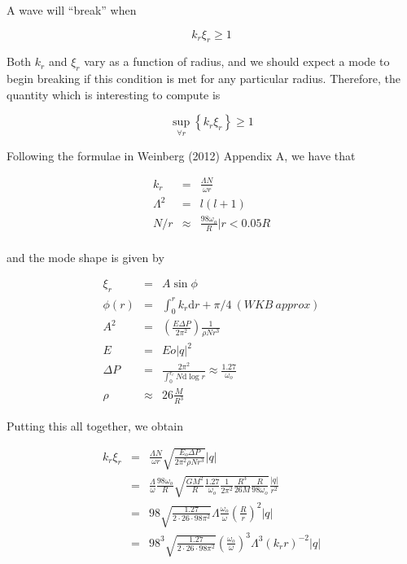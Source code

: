A wave will ``break'' when

\begin{equation}
k_r \xi_r \geq 1
\end{equation}

Both $k_r$ and $\xi_r$ vary as a function of radius, and we should expect a mode to begin breaking if this condition is met for any particular radius. Therefore, the quantity which is interesting to compute is

\begin{equation}
\sup_{\forall r} \left\{k_r \xi_r\right\} \geq 1
\end{equation}

Following the formulae in Weinberg (2012) Appendix A, we have that

\begin{eqnarray}
k_r & = & \frac{\Lambda N}{\omega r} \\
\Lambda^2 & = & l(l+1) \\
N/r & \approx & \frac{98 \omega_o}{R} \left| r < 0.05 R \right. \\
\end{eqnarray}

and the mode shape is given by

\begin{eqnarray}
\xi_r & = & A\sin\phi \\
\phi(r) & = & \int_0^r k_r \mathrm{d}r + \pi/4 \ (WKB\ approx) \\
A^2 & = & \left(\frac{E \Delta P}{2\pi^2}\right)\frac{1}{\rho N r^3} \\
E & = & Eo |q|^2 \\
\Delta P & = & \frac{2\pi^2}{\int_0^{r_c} N \mathrm{d} \log r} \approx \frac{1.27}{\omega_o} \\
\rho & \approx & 26\frac{M}{R^3}
\end{eqnarray}

Putting this all together, we obtain

\begin{eqnarray}
k_r \xi_r & = & \frac{\Lambda N}{\omega r} \sqrt{\frac{E_o \Delta P}{2 \pi ^2 \rho N r^3}} |q| \\
& = & \frac{\Lambda}{\omega}\frac{98\omega_o}{R} \sqrt{ \frac{GM^2}{R} \frac{1.27}{\omega_o} \frac{1}{2\pi^2} \frac{R^3}{26M} \frac{R}{98 \omega_o} } \frac{|q|}{r^2} \\
& = & 98 \sqrt{\frac{1.27}{2\cdot26\cdot98\pi^2}} \Lambda \frac{\omega_o}{\omega}\left(\frac{R}{r}\right)^2 |q| \\
& = & 98^3 \sqrt{\frac{1.27}{2\cdot26\cdot98\pi^2}} \left(\frac{\omega_o}{\omega}\right)^3 \Lambda^3 \left(k_r r\right)^{-2} |q| 
\end{eqnarray}

